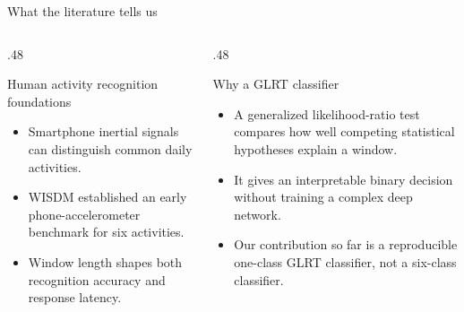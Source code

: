 \documentclass[aspectratio=169,10pt]{beamer}
\begin{document}
\begin{frame}{What the literature tells us}
  \begin{columns}[T,onlytextwidth]
    \begin{column}{.48\textwidth}
      \begin{block}{Human activity recognition foundations}
        \begin{itemize}
          \item Smartphone inertial signals can distinguish common daily activities.\cite{anguita2013}
          \item WISDM established an early phone-accelerometer benchmark for six activities.\cite{kwapisz2011}
          \item Window length shapes both recognition accuracy and response latency.\cite{banos2014}
        \end{itemize}
      \end{block}
    \end{column}
    \begin{column}{.48\textwidth}
      \begin{block}{Why a GLRT classifier}
        \begin{itemize}
          \item A generalized likelihood-ratio test compares how well competing statistical hypotheses explain a window.\cite{basseville1993}
          \item It gives an interpretable binary decision without training a complex deep network.
          \item Our contribution so far is a reproducible one-class GLRT classifier, not a six-class classifier.
        \end{itemize}
      \end{block}
    \end{column}
  \end{columns}
\end{frame}

\end{document}
